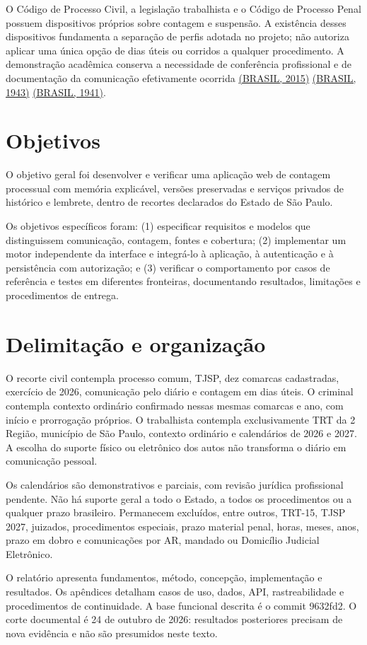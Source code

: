 O Código de Processo Civil, a legislação trabalhista e o Código de Processo Penal possuem dispositivos próprios sobre contagem e suspensão. A existência desses dispositivos fundamenta a separação de perfis adotada no projeto; não autoriza aplicar uma única opção de dias úteis ou corridos a qualquer procedimento. A demonstração acadêmica conserva a necessidade de conferência profissional e de documentação da comunicação efetivamente ocorrida \hyperref[ref:CPC]{(BRASIL, 2015)} \hyperref[ref:CLT]{(BRASIL, 1943)} \hyperref[ref:CPP]{(BRASIL, 1941)}.

\section{Objetivos}
\label{section-1-3}
O objetivo geral foi desenvolver e verificar uma aplicação web de contagem processual com memória explicável, versões preservadas e serviços privados de histórico e lembrete, dentro de recortes declarados do Estado de São Paulo.

Os objetivos específicos foram: (1) especificar requisitos e modelos que distinguissem comunicação, contagem, fontes e cobertura; (2) implementar um motor independente da interface e integrá-lo à aplicação, à autenticação e à persistência com autorização; e (3) verificar o comportamento por casos de referência e testes em diferentes fronteiras, documentando resultados, limitações e procedimentos de entrega.

\section{Delimitação e organização}
\label{section-1-4}
O recorte civil contempla processo comum, TJSP, dez comarcas cadastradas, exercício de 2026, comunicação pelo diário e contagem em dias úteis. O criminal contempla contexto ordinário confirmado nessas mesmas comarcas e ano, com início e prorrogação próprios. O trabalhista contempla exclusivamente TRT da 2\textordfeminine{} Região, município de São Paulo, contexto ordinário e calendários de 2026 e 2027. A escolha do suporte físico ou eletrônico dos autos não transforma o diário em comunicação pessoal.

Os calendários são demonstrativos e parciais, com revisão jurídica profissional pendente. Não há suporte geral a todo o Estado, a todos os procedimentos ou a qualquer prazo brasileiro. Permanecem excluídos, entre outros, TRT-15, TJSP 2027, juizados, procedimentos especiais, prazo material penal, horas, meses, anos, prazo em dobro e comunicações por AR, mandado ou Domicílio Judicial Eletrônico.

O relatório apresenta fundamentos, método, concepção, implementação e resultados. Os apêndices detalham casos de uso, dados, API, rastreabilidade e procedimentos de continuidade. A base funcional descrita é o commit 9632fd2. O corte documental é 24 de outubro de 2026: resultados posteriores precisam de nova evidência e não são presumidos neste texto.
